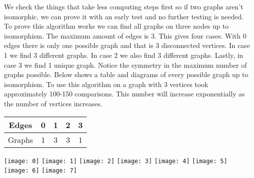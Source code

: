 \documentclass[12pt]{article}
\begin{document}
{We check the things that take less computing steps first so if two graphs aren't isomorphic, we can prove it with an early test and no further testing is needed. To prove this algorithm works we can find  all graphs on three nodes up to isomorphism.  The maximum amount of edges is 3.  This gives four cases.  With 0 edges there is only one possible graph and that is 3 disconnected vertices. In case 1 we find 3 different graphs. In case 2 we also find 3 different graphs.  Lastly, in case 3 we find 1 unique graph.  Notice the symmetry in the maximum number of graphs possible. Below shows a table and diagrams of every possible graph up to isomorphism.  To use this algorithm on a graph with 3 vertices took approximately 100-150 comparisons.  This number will increase exponentially as the number of vertices increases.

\begin{center}
 \begin{tabular}{||c c c c c||} 
 \hline
 Edges & 0 & 1 & 2 & 3 \\ [0.5ex] 
 \hline\hline
 Graphs & 1 & 3 & 3 & 1 \\ 
 \hline
\end{tabular}
\end{center}



\texttt{[image: 0]}
\texttt{[image: 1]}
\texttt{[image: 2]}
\texttt{[image: 3]}
\texttt{[image: 4]}
\texttt{[image: 5]}
\texttt{[image: 6]}
\texttt{[image: 7]}




}
\end{document}
